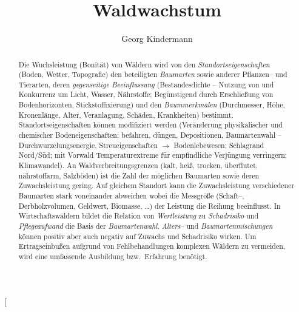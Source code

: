 \documentclass[twocolumn]{scrartcl}
\title{Waldwachstum}
\author{Georg Kindermann}
\begin{document}
\twocolumn[
  \begin{@twocolumnfalse}
    \maketitle
    \centering{\bfseries \Large\abstractname}
    \begin{abstract}
      Die Wuchsleistung (Bonität) von Wäldern wird von den
      \emph{Standortseigenschaften} (Boden, Wetter, Topografie) den beteiligten
      \emph{Baumarten} sowie anderer Pflanzen-- und Tierarten, deren
      \emph{gegenseitige Beeinflussung} (Bestandesdichte -- Nutzung von und
      Konkurrenz um Licht, Wasser, Nährstoffe; Begünstigend durch Erschließung
      von Bodenhorizonten, Stickstoffixierung) und den \emph{Baummerkmalen}
      (Durchmesser, Höhe, Kronenlänge, Alter, Veranlagung, Schäden, Krankheiten)
      bestimmt. Standortseigenschaften können modifiziert werden (Veränderung
      physikalischer und chemischer Bodeneigenschaften: befahren, düngen,
      Depositionen, Baumartenwahl -- Durchwurzelungsenergie, Streueigenschaften
      $\rightarrow$ Bodenlebewesen; Schlagrand Nord/Süd; mit Vorwald
      Temperaturextreme für empfindliche Verjüngung verringern; Klimawandel). An
      Waldverbreitungsgrenzen (kalt, heiß, trocken, überflutet, nährstoffarm,
      Salzböden) ist die Zahl der möglichen Baumarten sowie deren
      Zuwachsleistung gering. Auf gleichem Standort kann die Zuwachsleistung
      verschiedener Baumarten stark voneinander abweichen wobei die Messgröße
      (Schaft--, Derbholzvolumen, Geldwert, Biomasse, \dots) der Leistung die
      Reihung beeinflusst. In Wirtschaftswäldern bildet die Relation von
      \emph{Wertleistung} zu \emph{Schadrisiko} und \emph{Pflegeaufwand} die
      Basis der \emph{Baumartenwahl}. \emph{Alters--} und
      \emph{Baumartenmischungen} können positiv aber auch negativ auf Zuwachs
      und Schadrisiko wirken. Um Ertragseinbußen aufgrund von Fehlbehandlungen
      komplexen Wäldern zu vermeiden, wird eine umfassende Ausbildung bzw.\
      Erfahrung benötigt.


\end{abstract}
\end{@twocolumnfalse}
\end{document}
